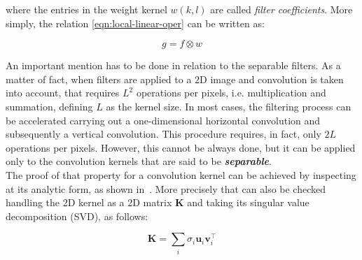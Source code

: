 where the entries in the weight kernel $w(k, l)$ are called \textit{filter coefficients}.
More simply, the relation \ref{eqn:local-linear-oper} can be written as:

\begin{equation}
	\label{eqn:compact-loc-lin-op}
	g = f \otimes w
\end{equation}

An important mention has to be done in relation to the separable filters.
As a matter of fact, when filters are applied to a 2D image and convolution is taken into account, that requires $L^2$ operations per pixels, i.e. multiplication and summation, defining $L$ as the kernel size.
In most cases, the filtering process can be accelerated carrying out a one-dimensional horizontal convolution and subsequently a vertical convolution. 
This procedure requires, in fact, only $2L$ operations per pixels.
However, this cannot be always done, but it can be applied only to the convolution kernels that are said to be \textbf{\textit{separable}}. \\
The proof of that property for a convolution kernel can be achieved by inspecting at its analytic form, as shown in~\cite{Freeman1991}.
More precisely that can also be checked handling the 2D kernel as a 2D matrix $\mathbf{K}$ and taking its singular value decomposition (SVD), as follows:

\begin{equation}
	\label{eqn:svd-check-separable}	
	\mathbf{K} = \sum_{i} \sigma_i \mathbf{u}_i \mathbf{v}_i^\top
\end{equation}

